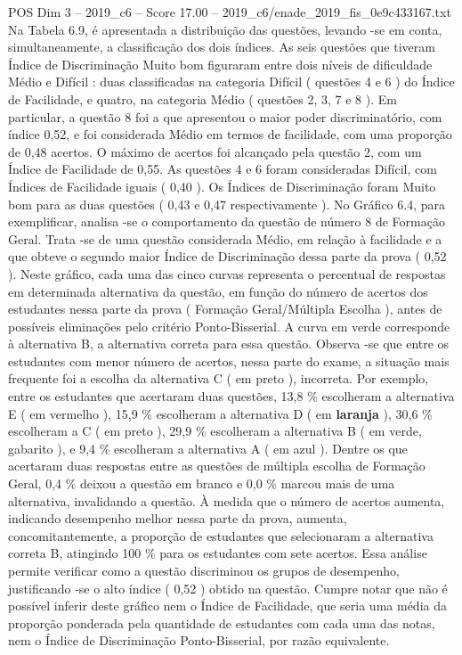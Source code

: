 \begin{textsample}{POS Dim 3 – 2019\_c6 – Score 17.00 – 2019\_c6/enade\_2019\_fis\_0e9c433167.txt}
Na Tabela 6.9, é apresentada a distribuição das questões, levando -se em conta, simultaneamente, a classificação dos dois índices.
As seis questões que tiveram Índice de Discriminação Muito bom figuraram entre dois níveis de dificuldade Médio e Difícil : duas classificadas na categoria Difícil ( questões 4 e 6 ) do Índice de Facilidade, e quatro, na categoria Médio ( questões 2, 3, 7 e 8 ).
Em particular, a questão 8 foi a que apresentou o maior poder discriminatório, com índice 0,52, e foi considerada Médio em termos de facilidade, com uma proporção de 0,48 acertos.
O máximo de acertos foi alcançado pela questão 2, com um Índice de Facilidade de 0,55.
As questões 4 e 6 foram consideradas Difícil, com Índices de Facilidade iguais ( 0,40 ).
Os Índices de Discriminação foram Muito bom para as duas questões ( 0,43 e 0,47 respectivamente ).
No Gráfico 6.4, para exemplificar, analisa -se o comportamento da questão de número 8 de Formação Geral.
Trata -se de uma questão considerada Médio, em relação à facilidade e a que obteve o segundo maior Índice de Discriminação dessa parte da prova ( 0,52 ).
Neste gráfico, cada uma das cinco curvas representa o percentual de respostas em determinada alternativa da questão, em função do número de acertos dos estudantes nessa parte da prova ( Formação Geral/Múltipla Escolha ), antes de possíveis eliminações pelo critério Ponto-Bisserial.
A curva em verde corresponde à alternativa B, a alternativa correta para essa questão.
Observa -se que entre os estudantes com menor número de acertos, nessa parte do exame, a situação mais frequente foi a escolha da alternativa C ( em preto ), incorreta.
Por exemplo, entre os estudantes que acertaram duas questões, 13,8 \% escolheram a alternativa E ( em vermelho ), 15,9 \% escolheram a alternativa D ( em \textbf{laranja} ), 30,6 \% escolheram a C ( em preto ), 29,9 \% escolheram a alternativa B ( em verde, gabarito ), e 9,4 \% escolheram a alternativa A ( em azul ).
Dentre os que acertaram duas respostas entre as questões de múltipla escolha de Formação Geral, 0,4 \% deixou a questão em branco e 0,0 \% marcou mais de uma alternativa, invalidando a questão.
À medida que o número de acertos aumenta, indicando desempenho melhor nessa parte da prova, aumenta, concomitantemente, a proporção de estudantes que selecionaram a alternativa correta B, atingindo 100 \% para os estudantes com sete acertos.
Essa análise permite verificar como a questão discriminou os grupos de desempenho, justificando -se o alto índice ( 0,52 ) obtido na questão.
Cumpre notar que não é possível inferir deste gráfico nem o Índice de Facilidade, que seria uma média da proporção ponderada pela quantidade de estudantes com cada uma das notas, nem o Índice de Discriminação Ponto-Bisserial, por razão equivalente.

\end{textsample}
